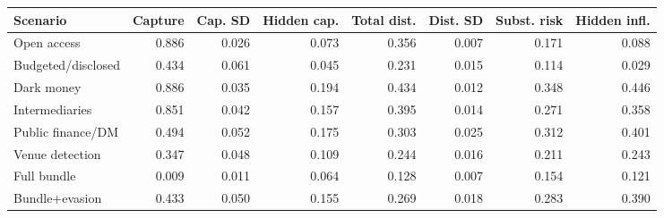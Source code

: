 \begingroup
\begin{center}
\begin{minipage}{\textwidth}
\centering
\footnotesize
\setlength{\tabcolsep}{3pt}
\begin{tabular*}{\textwidth}{@{\extracolsep{\fill}}lrrrrrrr@{}}
\toprule
Scenario & Capture & Cap. SD & Hidden cap. & Total dist. & Dist. SD & Subst. risk & Hidden infl. \\
\midrule
Open access & 0.886 & 0.026 & 0.073 & 0.356 & 0.007 & 0.171 & 0.088 \\
Budgeted/disclosed & 0.434 & 0.061 & 0.045 & 0.231 & 0.015 & 0.114 & 0.029 \\
Dark money & 0.886 & 0.035 & 0.194 & 0.434 & 0.012 & 0.348 & 0.446 \\
Intermediaries & 0.851 & 0.042 & 0.157 & 0.395 & 0.014 & 0.271 & 0.358 \\
Public finance/DM & 0.494 & 0.052 & 0.175 & 0.303 & 0.025 & 0.312 & 0.401 \\
Venue detection & 0.347 & 0.048 & 0.109 & 0.244 & 0.016 & 0.211 & 0.243 \\
Full bundle & 0.009 & 0.011 & 0.064 & 0.128 & 0.007 & 0.154 & 0.121 \\
Bundle+evasion & 0.433 & 0.050 & 0.155 & 0.269 & 0.018 & 0.283 & 0.390 \\
\bottomrule
\end{tabular*}
\par\smallskip
\captionsetup{hypcap=false}
\label{tab:first-campaign}
\end{minipage}
\end{center}
\endgroup

